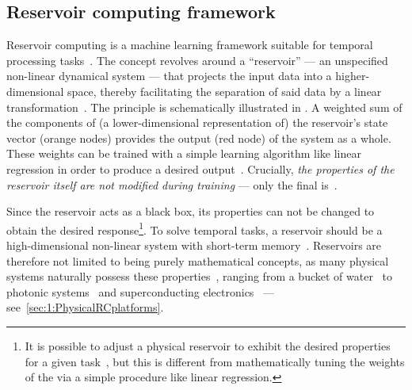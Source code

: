 \subsection{Reservoir computing framework}
Reservoir computing is a machine learning framework suitable for temporal processing tasks~\cite{BookReservoirComputing}.
The concept revolves around a ``reservoir'' --- an unspecified non-linear dynamical system --- that projects the input data into a higher-dimensional space, thereby facilitating the separation of said data by a linear transformation~\cite{appeltant2011information,KUR-24,RC_ASI}.
The principle is schematically illustrated in .
A weighted sum of the components of (a lower-dimensional representation of) the reservoir's state vector (orange nodes) provides the output (red node) of the system as a whole. %
These weights can be trained with a simple learning algorithm like linear regression in order to produce a desired output~\cite{RC_RecentAdvances, RC_SuperconductingElectronics}.
Crucially, \textit{the properties of the reservoir itself are not modified during training} --- only the final  is~\cite{RC_ASI,DynamicEmergence_NanomagneticSystem}. \par
Since the reservoir acts as a black box, its properties can not be changed to obtain the desired response\footnote{
	It is possible to adjust a physical reservoir to exhibit the desired properties for a given task~\cite{NeuromorphicFewShot,gartside2022reconfigurable}, but this is different from mathematically tuning the weights of the  via a simple procedure like linear regression.
}.
To solve temporal tasks, a reservoir should be a high-dimensional non-linear system with short-term memory~\cite{NeuromorphicAFMspintronics,RC_RecentAdvances}.
Reservoirs are therefore not limited to being purely mathematical concepts, as many physical systems naturally possess these properties~\cite{RC_DipoleNanomagnets,RC_PassiveFrustratedNM,RC_ASI,RC_RecentAdvances,NeuromorphicOscillators,VowelRecognition4STO,RC_DiffusiveMemristors,RC_MemristorTemporal,gartside2022reconfigurable}, ranging from a bucket of water~\cite{PatternRecognition_Bucket} to photonic systems~\cite{RC_Photonic} and superconducting electronics~\cite{RC_SuperconductingElectronics} --- see~\cref{sec:1:PhysicalRCplatforms}.
